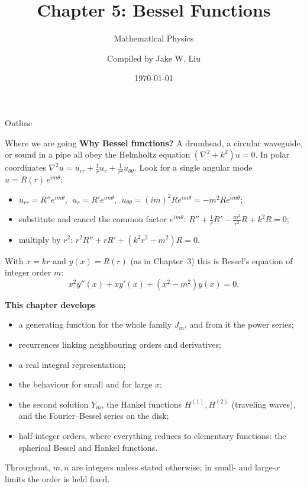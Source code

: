 \documentclass[11pt]{beamer}
\author[]{Compiled by Jake W. Liu}
\title[Bessel Functions]{Chapter 5: Bessel Functions}
\subtitle{Mathematical Physics}
\date{\today}
\begin{document}
\setcounter{sfchapter}{5}
\renewcommand{\thesection}{\arabic{sfchapter}.\arabic{section}}

\begin{frame}[c]\titlepage
\end{frame}

\begin{frame}{Outline}
\tableofcontents
\end{frame}

\begin{frame}[allowframebreaks=1.00]{Where we are going}
\footnotesize
\textbf{Why Bessel functions?} A drumhead, a circular waveguide, or sound in a pipe all obey the
Helmholtz equation \((\nabla^2+k^2)u=0\). In polar coordinates
\(\nabla^2u=u_{rr}+\frac1ru_r+\frac1{r^2}u_{\theta\theta}\). Look for a single angular mode
\(u=R(r)\,e^{im\theta}\):
\begin{itemize}
  \item \(u_{rr}=R''e^{im\theta}\), \(\;u_r=R'e^{im\theta}\), \(\;u_{\theta\theta}=(im)^2Re^{im\theta}=-m^2Re^{im\theta}\);
  \item substitute and cancel the common factor \(e^{im\theta}\):
        \(R''+\frac1rR'-\frac{m^2}{r^2}R+k^2R=0\);
  \item multiply by \(r^2\): \(r^2R''+rR'+(k^2r^2-m^2)R=0\).
\end{itemize}
With \(x=kr\) and \(y(x)=R(r)\) (as in Chapter~3) this is Bessel's equation of integer order \(m\):
\begin{equation}
  x^2 y''(x)+x y'(x)+(x^2-m^2)y(x)=0.
  \label{eq:bessel-ode-opening}
\end{equation}
\par\framebreak\par
\textbf{This chapter develops}
\begin{itemize}
  \item a generating function for the whole family \(J_m\), and from it the power series;
  \item recurrences linking neighbouring orders and derivatives;
  \item a real integral representation;
  \item the behaviour for small and for large \(x\);
  \item the second solution \(Y_m\), the Hankel functions \(H^{(1)},H^{(2)}\) (traveling waves), and the
        Fourier--Bessel series on the disk;
  \item half-integer orders, where everything reduces to elementary functions: the spherical Bessel
        and Hankel functions.
\end{itemize}
Throughout, \(m,n\) are integers unless stated otherwise; in small- and large-\(x\) limits the order is held
fixed.
\end{frame}
\end{document}

